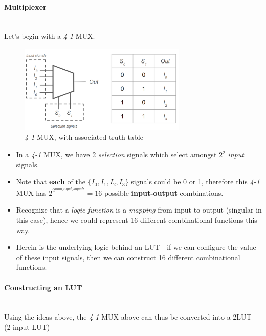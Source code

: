 \documentclass{article}
\begin{document}
\paragraph{Multiplexer}\mbox{}\\
Let's begin with a \textit{4-1} MUX.
\begin{figure}[htp]
    \centering
    \includegraphics[width=8cm, scale=1]{S2/4-1_mux.PNG}
    \caption{\textit{4-1} MUX, with associated truth table}
\end{figure}

\begin{itemize}
    \item In a \textit{4-1} MUX, we have 2 \textit{selection} signals which select amongst $2^{2}$ \textit{input} signals.
    \item Note that \textbf{each} of the $\{I_{0},I_{1},I_{2},I_{3}\}$ signals could be 0 or 1, therefore this \textit{4-1} MUX has $2^{2^{num\_input\_signals}} = 16$ possible \textbf{input-output} combinations.
    \item Recognize that a \textit{logic function} is a \textit{mapping} from input to output (singular in this case), hence we could represent 16 different combinational functions this way.
    \item Herein is the underlying logic behind an LUT - if we can configure the value of these input signals, then we can construct 16 different combinational functions.
\end{itemize}

\paragraph{Constructing an LUT}\mbox{}\\
Using the ideas above, the \textit{4-1} MUX above can thus be converted into a 2LUT (2-input LUT)
\end{document}
